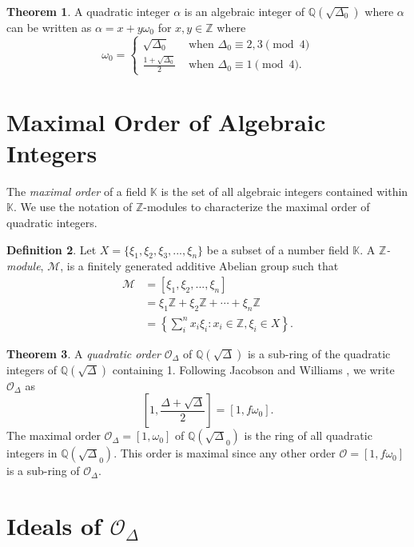 \documentclass{ucalgthes1}
\theoremstyle{definition}
\newtheorem{thm}{Theorem}[section]
\newtheorem{defn}[thm]{Definition}
\newcommand{\KK}{\mathbb{K}}
\newcommand{\MM}{\mathcal{M}}
\newcommand{\OO}{\mathcal{O}}
\newcommand{\ZZ}{\mathbb{Z}}
\newcommand{\QQ}{\mathbb{Q}}
\begin{document}
\begin{thm}
A quadratic integer $\alpha$ is an algebraic integer of $\QQ(\sqrt{\Delta_0})$ where $\alpha$ can be written as $\alpha = x + y \omega_0$ for $x, y \in \ZZ$ where
\begin{equation*}
	\omega_0 = \begin{cases}
		\sqrt{\Delta_0} & \textrm{ when } \Delta_0 \equiv 2, 3 \pmod 4 \\
		\frac{1+\sqrt{\Delta_0}}{2} & \textrm{ when } \Delta_0 \equiv 1 \pmod 4.
	\end{cases}
\end{equation*}
\end{thm}


\bigbreak
\section{Maximal Order of Algebraic Integers}

The \emph{maximal order} of a field $\KK$ is the set of all algebraic integers contained within $\KK$.  We use the notation of $\ZZ$-modules to characterize the maximal order of quadratic integers.


\begin{defn}
Let $X = \{ \xi_1, \xi_2, \xi_3, ..., \xi_n \}$ be a subset of a number field $\KK$.  A \emph{$\ZZ$\mbox{-}module}, $\MM$, is a finitely generated additive Abelian group such that
\begin{align*}
	\MM &= [ \xi_1, \xi_2, ..., \xi_n ] \\
	& =  \xi_1 \ZZ + \xi_2 \ZZ + \cdots + \xi_n \ZZ \\
	& = \left \{ \sum_{i}^n x_i \xi_i : x_i \in \ZZ, \xi_i \in X \right \}.
\end{align*}
\end{defn}

\begin{thm}
A \emph{quadratic order} $\OO_\Delta$ of $\QQ(\sqrt\Delta)$ is a sub-ring of the quadratic integers of $\QQ(\sqrt\Delta)$ containing 1.  Following Jacobson and Williams \cite[p.81]{Jacobson2009}, we write $\OO_\Delta$ as
\[
	\left[ 1, \frac{\Delta + \sqrt{\Delta}}{2} \right] = [1, f\omega_0].
\]
The maximal order $\OO_\Delta = [1, \omega_0]$ of $\QQ(\sqrt\Delta_0)$ is the ring of all quadratic integers in $\QQ(\sqrt\Delta_0)$.  This order is maximal since any other order $\OO = [1, f\omega_0]$ is a sub-ring of $\OO_\Delta$. 
\end{thm}


\bigbreak
\section{Ideals of $\OO_\Delta$}
\end{document}
